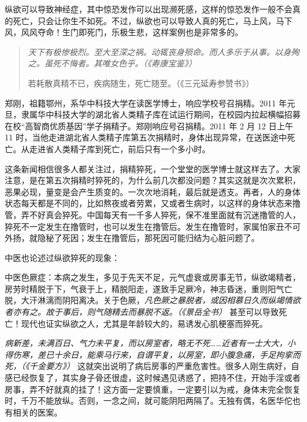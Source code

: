 纵欲可以导致神经症，其中惊恐发作可以出现濒死感，这样的惊恐发作一般不会真的死亡，只会让你生不如死。不过，纵欲也可以导致人真的死亡，马上风，马下风，风风夺命！生门即死门，乐极生悲，这样案例也是非常多的。

\begin{quotation}\it
    天下有极惨极烈。至大至深之祸。动辄丧身殒命。而人多乐于从事。以身殉之。虽死不悔者。其唯女色乎。（《寿康宝鉴》）

    若耗散真精不已，疾病随生，死亡随至。（《三元延寿参赞书》）
\end{quotation}

\begin{case}[猝死]
    郑刚，祖籍鄂州，系华中科技大学在读医学博士，响应学校号召捐精。2011 年元旦，隶属华中科技大学的湖北省人类精子库在试运行期间，在校园内拉起横幅招募在校“高智商优质基因”学子捐精子。郑刚响应号召捐精。2011 年 2 月 12 日上午 11 时，当他走进湖北省人类精子库第五次捐精时，身体出现异常，在送医途中死亡。从走进省人类精子库到死亡，前后只有一个多小时。
\end{case}

这条新闻相信很多人都关注过，捐精猝死，一个堂堂的医学博士就这样去了。大家注意，是在第五次捐精时猝死的，为什么前几次都没问题？其实这就是次次累积，恶果必现，量变是会产生质变的。一次次地消耗，最后就是透支。再者，人的身体状态每天都是不同的，比如熬夜或者劳累，又或者生病时，以这样的身体状态来撸管，弄不好真会猝死。中国每天有一千多人猝死，保不准里面就有沉迷撸管的人，猝死不一定发生在撸管时，也可以发生在撸管后。发生在撸管时，家属怕家丑不可外扬，就隐秘了死因；发生在撸管后，那死因可能归结为心脏问题了。

中医也论述过纵欲猝死的现象：

中医色厥症：本病之发生，多见于先天不足，元气虚衰或房事无节，纵欲竭精者，房劳时精脱于下，气衰于上，精脱阳走，遂致手足厥冷，神志昏迷，重则阳气亡脱，大汗淋漓而阴阳离决。关于色厥，\textit{凡色厥之暴脱者，或因相慕日久而纵竭情欲者亦有之。故于事后，则气随精去而暴脱不返。（《景岳全书）} 甚至可以导致死亡！现代也证实纵欲之人，尤其是年龄较大的，易诱发心肌梗塞而猝死。

\textit{病新差，未满百日、气力未平复，而以房室者，略无不死……近者有一士大大，小得伤寒，差已十余日，能乘马行来，自谓平复，以房室，即小腹急痛，手足拘挛而死，（《千金要方》）} 这就突出说明了病后房事的严重危害性。很多人刚生病好，自感已经恢复了，其实身子骨还很虚，这时候遇见诱惑了，把持不住，开始手淫或者房事，弄不好就真的挂了！这方面一定要慎重，一定要引以为戒，身体未完全恢复时，千万不能放纵。否则，一念之间，就可能阴阳两隔了。无独有偶，名医华佗也有相关的医案。

